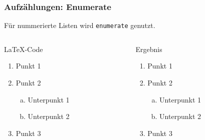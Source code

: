 \begin{frame}[fragile]
    \frametitle{Aufzählungen: Enumerate}
    Für nummerierte Listen wird \texttt{enumerate} genutzt.
    \begin{columns}[t]
        \begin{column}{0.47\textwidth}
            \begin{block}{\LaTeX-Code}
                \begin{lstverbatim}
                \begin{enumerate}
                    \item Punkt 1
                    \item Punkt 2
                        \begin{enumerate}[(a)] 
                            \item Unterpunkt 1
                            \item Unterpunkt 2
                        \end{enumerate}
                    \item Punkt 3
                \end{enumerate}
                \end{lstverbatim}
            \end{block}
        \end{column}
        \begin{column}{0.47\textwidth}
            \begin{block}{Ergebnis}
                \begin{enumerate}
                    \item Punkt 1
                    \item Punkt 2
                        \begin{enumerate}[(a)]
                            \item Unterpunkt 1
                            \item Unterpunkt 2
                        \end{enumerate}
                    \item Punkt 3
                \end{enumerate}
            \end{block} 
        \end{column}
    \end{columns}
\end{frame}
